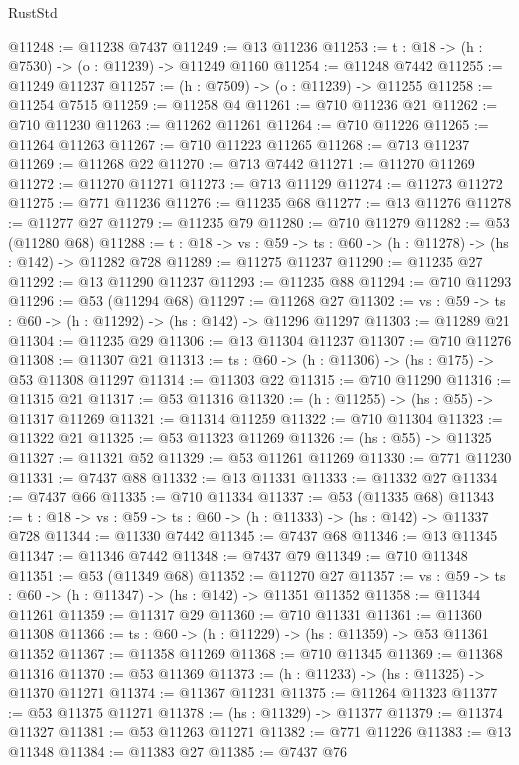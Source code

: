 \begin{lexlean}{RustStd}
\begin{coremodule}
@11248 := @11238 @7437
@11249 := @13 @11236
@11253 := {t : @18} -> (h : @7530) -> (o : @11239) -> @11249 @1160
@11254 := @11248 @7442
@11255 := @11249 @11237
@11257 := (h : @7509) -> (o : @11239) -> @11255
@11258 := @11254 @7515
@11259 := @11258 @4
@11261 := @710 @11236 @21
@11262 := @710 @11230
@11263 := @11262 @11261
@11264 := @710 @11226
@11265 := @11264 @11263
@11267 := @710 @11223 @11265
@11268 := @713 @11237
@11269 := @11268 @22
@11270 := @713 @7442
@11271 := @11270 @11269
@11272 := @11270 @11271
@11273 := @713 @11129
@11274 := @11273 @11272
@11275 := @771 @11236
@11276 := @11235 @68
@11277 := @13 @11276
@11278 := @11277 @27
@11279 := @11235 @79
@11280 := @710 @11279
@11282 := @53 (@11280 @68)
@11288 := {t : @18} -> {vs : @59} -> {ts : @60} -> (h : @11278) -> (hs : @142) -> @11282 @728
@11289 := @11275 @11237
@11290 := @11235 @27
@11292 := @13 @11290 @11237
@11293 := @11235 @88
@11294 := @710 @11293
@11296 := @53 (@11294 @68)
@11297 := @11268 @27
@11302 := {vs : @59} -> {ts : @60} -> (h : @11292) -> (hs : @142) -> @11296 @11297
@11303 := @11289 @21
@11304 := @11235 @29
@11306 := @13 @11304 @11237
@11307 := @710 @11276
@11308 := @11307 @21
@11313 := {ts : @60} -> (h : @11306) -> (hs : @175) -> @53 @11308 @11297
@11314 := @11303 @22
@11315 := @710 @11290
@11316 := @11315 @21
@11317 := @53 @11316
@11320 := (h : @11255) -> (hs : @55) -> @11317 @11269
@11321 := @11314 @11259
@11322 := @710 @11304
@11323 := @11322 @21
@11325 := @53 @11323 @11269
@11326 := (hs : @55) -> @11325
@11327 := @11321 @52
@11329 := @53 @11261 @11269
@11330 := @771 @11230
@11331 := @7437 @88
@11332 := @13 @11331
@11333 := @11332 @27
@11334 := @7437 @66
@11335 := @710 @11334
@11337 := @53 (@11335 @68)
@11343 := {t : @18} -> {vs : @59} -> {ts : @60} -> (h : @11333) -> (hs : @142) -> @11337 @728
@11344 := @11330 @7442
@11345 := @7437 @68
@11346 := @13 @11345
@11347 := @11346 @7442
@11348 := @7437 @79
@11349 := @710 @11348
@11351 := @53 (@11349 @68)
@11352 := @11270 @27
@11357 := {vs : @59} -> {ts : @60} -> (h : @11347) -> (hs : @142) -> @11351 @11352
@11358 := @11344 @11261
@11359 := @11317 @29
@11360 := @710 @11331
@11361 := @11360 @11308
@11366 := {ts : @60} -> (h : @11229) -> (hs : @11359) -> @53 @11361 @11352
@11367 := @11358 @11269
@11368 := @710 @11345
@11369 := @11368 @11316
@11370 := @53 @11369
@11373 := (h : @11233) -> (hs : @11325) -> @11370 @11271
@11374 := @11367 @11231
@11375 := @11264 @11323
@11377 := @53 @11375 @11271
@11378 := (hs : @11329) -> @11377
@11379 := @11374 @11327
@11381 := @53 @11263 @11271
@11382 := @771 @11226
@11383 := @13 @11348
@11384 := @11383 @27
@11385 := @7437 @76

\end{coremodule}
\end{lexlean}
